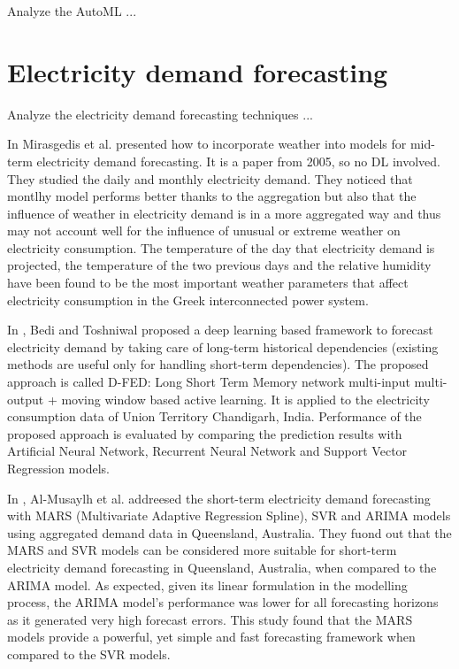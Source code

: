 Analyze the AutoML ...
\cite{HE2021106622}
\cite{Gijsbers2019}
\cite{Feurer2020}
\cite{Zimmer2020}
\cite{Deng2022}
\cite{su142215292}
\cite{Karmaker2021}
\cite{Chen2021}
\cite{computers10010011}
\cite{Elshawi2019}
\cite{Feurer2015}
\cite{9534091}
\cite{9579526}
\cite{9660073}
\cite{8955514}
\cite{8995391}
\cite{9033810}
\cite{9564380}


\section{Electricity demand forecasting}
\label{sec:demandsoa}
\vspace{0.2 cm}

Analyze the electricity demand forecasting techniques ...

In \cite{MIRASGEDIS2006208} Mirasgedis et al. presented how to incorporate weather into models for mid-term electricity demand forecasting.
It is a paper from 2005, so no DL involved.
They studied the daily and monthly electricity demand.
They noticed that montlhy model performs better thanks to the aggregation but also that the influence of weather in electricity demand is in a more aggregated way and thus may not account well for the influence of unusual or extreme weather on electricity consumption.
The temperature of the day that electricity demand is projected, the temperature of the two previous days and the relative humidity have been found to be the most important weather parameters that affect electricity consumption in the Greek interconnected power system.

In \cite{BEDI20191312}, Bedi and Toshniwal proposed a deep learning based framework to forecast electricity demand by taking care of long-term historical dependencies (existing methods are useful only for handling short-term dependencies).
The proposed approach is called D-FED: Long Short Term Memory network multi-input multi-output + moving window based active learning.
It is applied to the electricity consumption data of Union Territory Chandigarh, India.
Performance of the proposed approach is evaluated by comparing the prediction results with Artificial Neural Network, Recurrent Neural Network and Support Vector Regression models.

In \cite{ALMUSAYLH20181}, Al-Musaylh et al. addreesed the short-term electricity demand forecasting with MARS (Multivariate Adaptive Regression Spline), SVR and ARIMA models using aggregated demand data in Queensland, Australia.
They fuond out that the MARS and SVR models can be considered more suitable for short-term electricity demand forecasting in Queensland, Australia, when compared to the ARIMA model.
As expected, given its linear formulation in the modelling process, the ARIMA model’s performance was lower for all forecasting horizons as it generated very high forecast errors.
This study found that the MARS models provide a powerful, yet simple and fast forecasting framework when compared to the SVR models.

